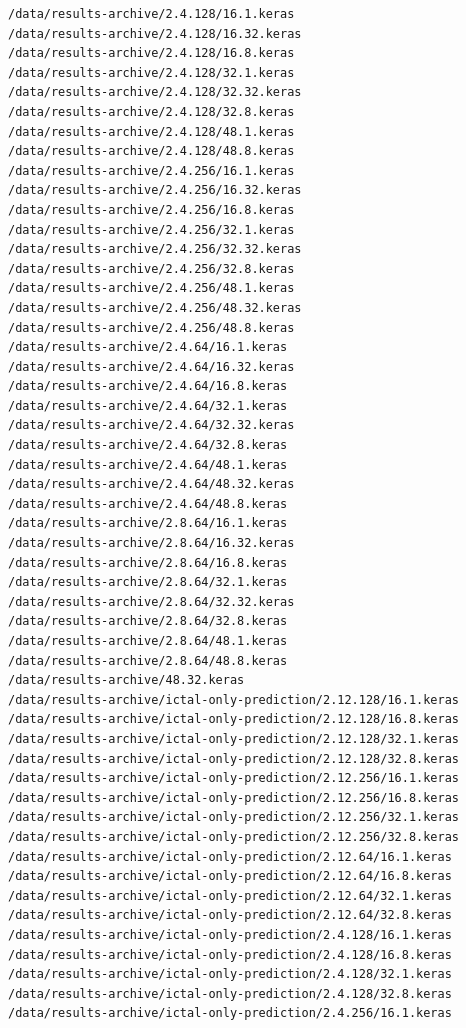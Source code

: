 \documentclass[12pt]{article}
\begin{document}
\begin{lstlisting}[style=logstyle, caption={List of failed trained models. See \ref{issues}}, label={lst:model-list}]
/data/results-archive/2.4.128/16.1.keras
/data/results-archive/2.4.128/16.32.keras
/data/results-archive/2.4.128/16.8.keras
/data/results-archive/2.4.128/32.1.keras
/data/results-archive/2.4.128/32.32.keras
/data/results-archive/2.4.128/32.8.keras
/data/results-archive/2.4.128/48.1.keras
/data/results-archive/2.4.128/48.8.keras
/data/results-archive/2.4.256/16.1.keras
/data/results-archive/2.4.256/16.32.keras
/data/results-archive/2.4.256/16.8.keras
/data/results-archive/2.4.256/32.1.keras
/data/results-archive/2.4.256/32.32.keras
/data/results-archive/2.4.256/32.8.keras
/data/results-archive/2.4.256/48.1.keras
/data/results-archive/2.4.256/48.32.keras
/data/results-archive/2.4.256/48.8.keras
/data/results-archive/2.4.64/16.1.keras
/data/results-archive/2.4.64/16.32.keras
/data/results-archive/2.4.64/16.8.keras
/data/results-archive/2.4.64/32.1.keras
/data/results-archive/2.4.64/32.32.keras
/data/results-archive/2.4.64/32.8.keras
/data/results-archive/2.4.64/48.1.keras
/data/results-archive/2.4.64/48.32.keras
/data/results-archive/2.4.64/48.8.keras
/data/results-archive/2.8.64/16.1.keras
/data/results-archive/2.8.64/16.32.keras
/data/results-archive/2.8.64/16.8.keras
/data/results-archive/2.8.64/32.1.keras
/data/results-archive/2.8.64/32.32.keras
/data/results-archive/2.8.64/32.8.keras
/data/results-archive/2.8.64/48.1.keras
/data/results-archive/2.8.64/48.8.keras
/data/results-archive/48.32.keras
/data/results-archive/ictal-only-prediction/2.12.128/16.1.keras
/data/results-archive/ictal-only-prediction/2.12.128/16.8.keras
/data/results-archive/ictal-only-prediction/2.12.128/32.1.keras
/data/results-archive/ictal-only-prediction/2.12.128/32.8.keras
/data/results-archive/ictal-only-prediction/2.12.256/16.1.keras
/data/results-archive/ictal-only-prediction/2.12.256/16.8.keras
/data/results-archive/ictal-only-prediction/2.12.256/32.1.keras
/data/results-archive/ictal-only-prediction/2.12.256/32.8.keras
/data/results-archive/ictal-only-prediction/2.12.64/16.1.keras
/data/results-archive/ictal-only-prediction/2.12.64/16.8.keras
/data/results-archive/ictal-only-prediction/2.12.64/32.1.keras
/data/results-archive/ictal-only-prediction/2.12.64/32.8.keras
/data/results-archive/ictal-only-prediction/2.4.128/16.1.keras
/data/results-archive/ictal-only-prediction/2.4.128/16.8.keras
/data/results-archive/ictal-only-prediction/2.4.128/32.1.keras
/data/results-archive/ictal-only-prediction/2.4.128/32.8.keras
/data/results-archive/ictal-only-prediction/2.4.256/16.1.keras

\end{lstlisting}
\end{document}
